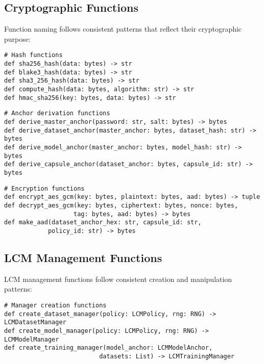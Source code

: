 \documentclass[12pt,a4paper]{article}
\begin{document}
\subsection{Cryptographic Functions}

Function naming follows consistent patterns that reflect their cryptographic purpose:

\begin{lstlisting}[caption=Hash Functions]
# Hash functions
def sha256_hash(data: bytes) -> str
def blake3_hash(data: bytes) -> str  
def sha3_256_hash(data: bytes) -> str
def compute_hash(data: bytes, algorithm: str) -> str
def hmac_sha256(key: bytes, data: bytes) -> str
\end{lstlisting}

\begin{lstlisting}[caption=Anchor Derivation Functions]
# Anchor derivation functions
def derive_master_anchor(password: str, salt: bytes) -> bytes
def derive_dataset_anchor(master_anchor: bytes, dataset_hash: str) -> bytes
def derive_model_anchor(master_anchor: bytes, model_hash: str) -> bytes
def derive_capsule_anchor(dataset_anchor: bytes, capsule_id: str) -> bytes
\end{lstlisting}

\begin{lstlisting}[caption=Encryption Functions]
# Encryption functions
def encrypt_aes_gcm(key: bytes, plaintext: bytes, aad: bytes) -> tuple
def decrypt_aes_gcm(key: bytes, ciphertext: bytes, nonce: bytes, 
                   tag: bytes, aad: bytes) -> bytes
def make_aad(dataset_anchor_hex: str, capsule_id: str, 
            policy_id: str) -> bytes
\end{lstlisting}

\subsection{LCM Management Functions}

LCM management functions follow consistent creation and manipulation patterns:

\begin{lstlisting}[caption=Manager Creation Functions]
# Manager creation functions
def create_dataset_manager(policy: LCMPolicy, rng: RNG) -> LCMDatasetManager
def create_model_manager(policy: LCMPolicy, rng: RNG) -> LCMModelManager
def create_training_manager(model_anchor: LCMModelAnchor, 
                          datasets: List) -> LCMTrainingManager
\end{lstlisting}
\end{document}

